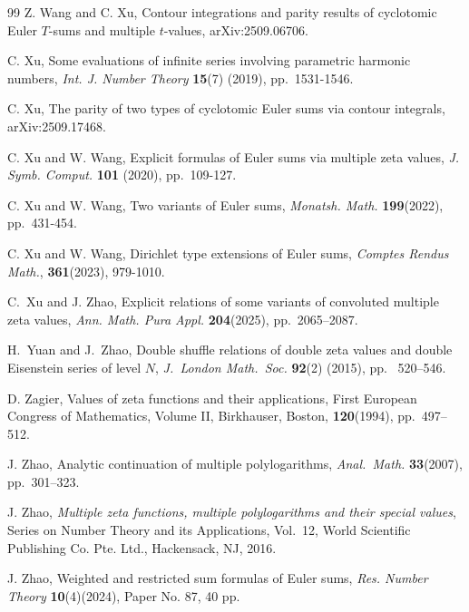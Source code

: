 \documentclass[11pt]{article}
\theoremstyle{plain}
\theoremstyle{definition}
\begin{document}
\begin{thebibliography}{99}
Z. Wang and C. Xu, Contour integrations and parity results of cyclotomic Euler $T$-sums and multiple $t$-values, arXiv:2509.06706.

C. Xu, Some evaluations of infinite series involving parametric harmonic numbers, \emph{Int. J. Number Theory} {\bf 15}(7) (2019), pp.\ 1531-1546.

C. Xu, The parity of two types of cyclotomic Euler sums via contour integrals, arXiv:2509.17468.

C. Xu and W. Wang, Explicit formulas of Euler sums via multiple zeta values, \emph{J. Symb. Comput.} \textbf{101} (2020), pp.\ 109-127.

C. Xu and W. Wang, Two variants of Euler sums, \emph{Monatsh. Math.} \textbf{199}(2022), pp.\ 431-454.

C. Xu and W. Wang, Dirichlet type extensions of Euler sums, \emph{Comptes Rendus Math.}, \textbf{361}(2023), 979-1010.

C.\ Xu and J. Zhao, Explicit relations of some variants of convoluted multiple zeta values, \emph{Ann. Math. Pura Appl.} \textbf{204}(2025), pp.\ 2065--2087.

H.\ Yuan and J.\ Zhao, Double shuffle relations of double zeta values
and double Eisenstein series of level $N$,
\emph{J.\ London Math.\ Soc.}  \textbf{92}(2) (2015), pp. \ 520--546.

D. Zagier, Values of zeta functions and their applications, First European Congress
of Mathematics, Volume II, Birkhauser, Boston, \textbf{120}(1994), pp.\ 497--512.

J. Zhao, Analytic continuation of multiple polylogarithms, \emph{Anal.\ Math.} \textbf{33}(2007), pp.\ 301--323.

J. Zhao, \emph{Multiple zeta functions, multiple polylogarithms and their special values}, Series on Number
Theory and its Applications, Vol.~12, World Scientific Publishing Co. Pte. Ltd., Hackensack, NJ, 2016.

J. Zhao, Weighted and restricted sum formulas of Euler sums, \emph{Res. Number Theory} \textbf{10}(4)(2024), Paper No. 87, 40 pp.

\end{thebibliography}
\end{document}
